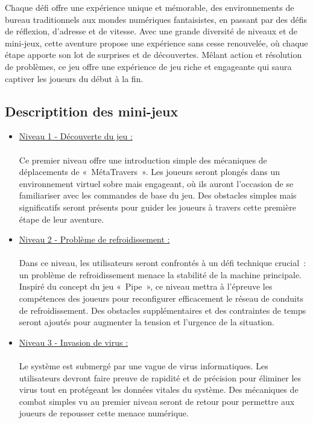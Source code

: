 \documentclass[12pt,a4paper]{article}
\begin{document}
            \tabto{1cm} Chaque défi offre une expérience unique et mémorable, des environnements de bureau traditionnels aux mondes numériques fantaisistes, en passant par des défis de réflexion, d'adresse et de vitesse. Avec une grande diversité de niveaux et de mini-jeux, cette aventure propose une expérience sans cesse renouvelée, où chaque étape apporte son lot de surprises et de découvertes. Mêlant action et résolution de problèmes, ce jeu offre une expérience de jeu riche et engageante qui saura captiver les joueurs du début à la fin.
            
        \subsection{Descriptition des mini-jeux}
        
            \begin{itemize}
            
                \item \tabto{1cm} \underline{Niveau 1 - Découverte du jeu :} \\\\
                \tabto{1cm} Ce premier niveau offre une introduction simple des mécaniques de déplacements de «~MétaTravers~». Les joueurs seront plongés dans un environnement virtuel sobre mais engageant, où ils auront l'occasion de se familiariser avec les commandes de base du jeu. Des obstacles simples mais significatifs seront présents pour guider les joueurs à travers cette première étape de leur aventure.\\
                
                \item \tabto{1cm} \underline{Niveau 2 - Problème de refroidissement :}\\\\
                \tabto{1cm} Dans ce niveau, les utilisateurs seront confrontés à un défi technique crucial~: un problème de refroidissement menace la stabilité de la machine principale. Inspiré du concept du jeu «~Pipe~», ce niveau mettra à l'épreuve les compétences des joueurs pour reconfigurer efficacement le réseau de conduits de refroidissement. Des obstacles supplémentaires et des contraintes de temps seront ajoutés pour augmenter la tension et l'urgence de la situation.\\

                \item \tabto{1cm} \underline{Niveau 3 - Invasion de virus :}\\\\
                \tabto{1cm} Le système est submergé par une vague de virus informatiques. Les utilisateurs devront faire preuve de rapidité et de précision pour éliminer les virus tout en protégeant les données vitales du système. Des mécaniques de combat simples vu au premier niveau seront de retour pour permettre aux joueurs de repousser cette menace numérique.\\
                

\end{itemize}
\end{document}
